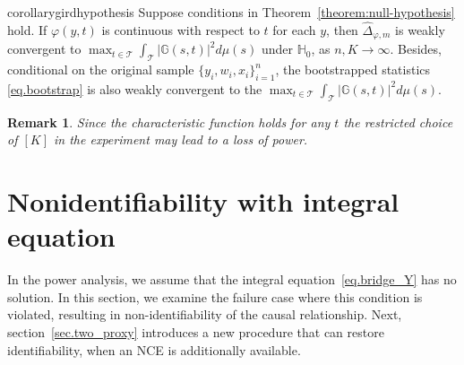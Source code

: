 \documentclass[
  12pt]{article}
\newtheorem{remark}{Remark}
\def\to{\rightarrow}
\def\mG{\mathbb{G}}
\def\mH{\mathbb{H}}
\def\cT{\mathcal{T}}
\begin{document}
\begin{restatable}{corollary}{girdhypothesis}
\label{coro:hypothesis}
Suppose conditions in Theorem~\ref{theorem:null-hypothesis} hold. If $\varphi(y,t)$ is continuous with respect to $t$ for each $y$, then $\widehat{\Delta}_{\varphi ,m}$ is weakly convergent to $\max_{t \in \cT}\int_{\mathcal{T}}{| \mathbb{G}(s,t)|^2d\mu(s)}$ under $\mH_0$, as $n, K \to \infty$. Besides, conditional on the original sample $\{y_i,w_i,x_i\}_{i=1}^n$, the bootstrapped statistics \eqref{eq.bootstrap} is also weakly convergent to the $\max_{t \in \cT}\int_{\mathcal{T}}{| \mathbb{G}(s,t)|^2d\mu(s)}$. 
\end{restatable}
\begin{remark}
   Since the characteristic function holds for any $t$ the restricted choice of $[K]$ in the experiment may lead to a loss of power.
\end{remark}





\section{Nonidentifiability with integral equation}
\label{sec.fail}

In the power analysis, we assume that the integral equation~\eqref{eq.bridge_Y} has no solution. In this section, we examine the failure case where this condition is violated, resulting in non-identifiability of the causal relationship. Next, section~\ref{sec.two_proxy} introduces a new procedure that can restore identifiability, when an NCE is additionally available. 
 
\end{document}
